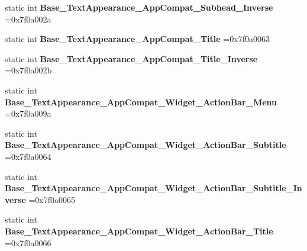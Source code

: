 \begin{DoxyCompactItemize}
\item 
\mbox{\label{classandroid_1_1support_1_1v7_1_1appcompat_1_1R_1_1style_a1b6766a1933073a38621c432a89b190d}} 
static int {\bfseries Base\+\_\+\+Text\+Appearance\+\_\+\+App\+Compat\+\_\+\+Subhead\+\_\+\+Inverse} =0x7f0a002a
\item 
\mbox{\label{classandroid_1_1support_1_1v7_1_1appcompat_1_1R_1_1style_ae32b6cae0de9ba0bd8c6dccec94ce262}} 
static int {\bfseries Base\+\_\+\+Text\+Appearance\+\_\+\+App\+Compat\+\_\+\+Title} =0x7f0a0063
\item 
\mbox{\label{classandroid_1_1support_1_1v7_1_1appcompat_1_1R_1_1style_a28c7c64ff0b5c16a819436ad8352ecfe}} 
static int {\bfseries Base\+\_\+\+Text\+Appearance\+\_\+\+App\+Compat\+\_\+\+Title\+\_\+\+Inverse} =0x7f0a002b
\item 
\mbox{\label{classandroid_1_1support_1_1v7_1_1appcompat_1_1R_1_1style_a515e5b0567410880f129343a9e16e59f}} 
static int {\bfseries Base\+\_\+\+Text\+Appearance\+\_\+\+App\+Compat\+\_\+\+Widget\+\_\+\+Action\+Bar\+\_\+\+Menu} =0x7f0a009a
\item 
\mbox{\label{classandroid_1_1support_1_1v7_1_1appcompat_1_1R_1_1style_aef4729f7da43e04416aa62a149ff3e34}} 
static int {\bfseries Base\+\_\+\+Text\+Appearance\+\_\+\+App\+Compat\+\_\+\+Widget\+\_\+\+Action\+Bar\+\_\+\+Subtitle} =0x7f0a0064
\item 
\mbox{\label{classandroid_1_1support_1_1v7_1_1appcompat_1_1R_1_1style_ab695baa7a6e395a42c68ec4ec9c891ad}} 
static int {\bfseries Base\+\_\+\+Text\+Appearance\+\_\+\+App\+Compat\+\_\+\+Widget\+\_\+\+Action\+Bar\+\_\+\+Subtitle\+\_\+\+Inverse} =0x7f0a0065
\item 
\mbox{\label{classandroid_1_1support_1_1v7_1_1appcompat_1_1R_1_1style_a6976034614be1acc93aee934d983dd72}} 
static int {\bfseries Base\+\_\+\+Text\+Appearance\+\_\+\+App\+Compat\+\_\+\+Widget\+\_\+\+Action\+Bar\+\_\+\+Title} =0x7f0a0066

\end{DoxyCompactItemize}
